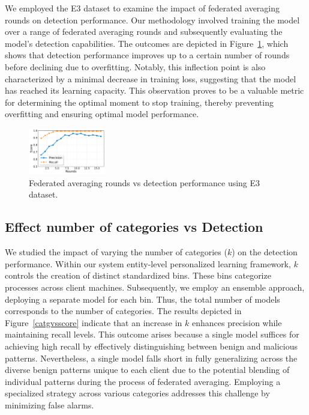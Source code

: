 We employed the \darpa E3 dataset to examine the impact of federated averaging rounds on detection performance. Our methodology involved training the model over a range of federated averaging rounds and subsequently evaluating the model's detection capabilities. The outcomes are depicted in Figure~\ref{roundsvsscore}, which shows that detection performance improves up to a certain number of rounds before declining due to overfitting. Notably, this inflection point is also characterized by a minimal decrease in training loss, suggesting that the model has reached its learning capacity. This observation proves to be a valuable metric for determining the optimal moment to stop training, thereby preventing overfitting and ensuring optimal model performance.

\begin{figure}[!t]
  \centering
  \includegraphics[width=0.3\textwidth]{fig/roundsvsscore.pdf}
  \caption{Federated averaging rounds vs detection performance using E3 dataset. }
  \label{roundsvsscore}
  \vspace{-2ex}
\end{figure}


\subsection*{Effect number of categories vs Detection}
\label{app:categories}

We studied the impact of varying the number of categories ($k$) on the detection performance. Within our system entity-level personalized \gnnshort learning framework, $k$ controls the creation of distinct standardized bins. These bins categorize processes across client machines. Subsequently, we employ an ensemble approach, deploying a separate \gnnshort model for each bin. Thus, the total number of \gnnshort models corresponds to the number of categories. The results depicted in Figure~\ref{catgvsscore} indicate that an increase in $k$ enhances precision while maintaining recall levels. This outcome arises because a single model suffices for achieving high recall by effectively distinguishing between benign and malicious patterns. Nevertheless, a single model falls short in fully generalizing across the diverse benign patterns unique to each client due to the potential blending of individual patterns during the process of federated averaging. Employing a specialized \gnnshort strategy across various categories addresses this challenge by minimizing false alarms.

